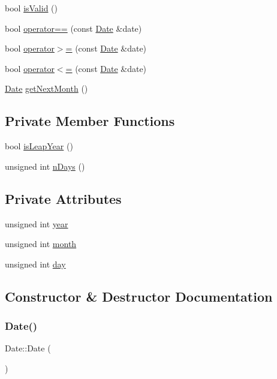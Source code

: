 \begin{DoxyCompactItemize}
\item 
bool \hyperlink{classDate_a7d9aaa9db591413e21c8b85fdae130ad}{is\+Valid} ()
\item 
bool \hyperlink{classDate_a4b933e8c9e1a5853918ad88eb2fc2dae}{operator==} (const \hyperlink{classDate}{Date} \&date)
\item 
bool \hyperlink{classDate_a4a291faa73653c0a14981db2dee21678}{operator$>$=} (const \hyperlink{classDate}{Date} \&date)
\item 
bool \hyperlink{classDate_ab0656086910c8debe2a1fb5d2ae197ba}{operator$<$=} (const \hyperlink{classDate}{Date} \&date)
\item 
\hyperlink{classDate}{Date} \hyperlink{classDate_a2a6e45e4a2de73d7ec7b9227442c4a3f}{get\+Next\+Month} ()
\end{DoxyCompactItemize}
\subsection*{Private Member Functions}
\begin{DoxyCompactItemize}
\item 
bool \hyperlink{classDate_ab83816d7572d1a15c6e86378b82a54f0}{is\+Leap\+Year} ()
\item 
unsigned int \hyperlink{classDate_a9cd38c6d1cc0e326baef6ab8a25029b8}{n\+Days} ()
\end{DoxyCompactItemize}
\subsection*{Private Attributes}
\begin{DoxyCompactItemize}
\item 
unsigned int \hyperlink{classDate_afc014a1ae62e56be473144050201e62a}{year}
\item 
unsigned int \hyperlink{classDate_af48402007169fe01234fe9bb9e7a1d2c}{month}
\item 
unsigned int \hyperlink{classDate_a6c498dee79268960e000ec3deaa555ac}{day}
\end{DoxyCompactItemize}


\subsection{Constructor \& Destructor Documentation}
\hypertarget{classDate_a4e59ed4ba66eec61c27460c5d09fa1bd}{}\label{classDate_a4e59ed4ba66eec61c27460c5d09fa1bd} 
\subsubsection{\texorpdfstring{Date()}{Date()}\hspace{0.1cm}{\footnotesize\ttfamily [1/3]}}
{\footnotesize\ttfamily Date\+::\+Date (\begin{DoxyParamCaption}{ }\end{DoxyParamCaption})}


